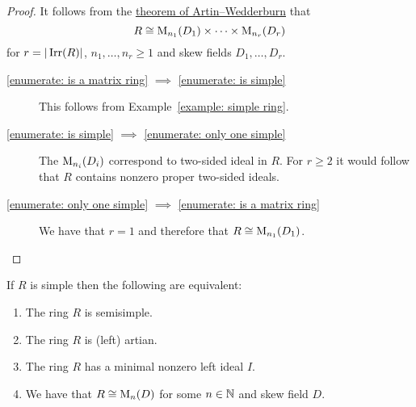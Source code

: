 \begin{proof}
  It follows from the \hyperref[theorem: artin wedderburn theorem]{theorem of Artin--Wedderburn} that
  \[
    R \cong \operatorname{M}_{n_1}(D_1) \times \dotsb \times \operatorname{M}_{n_r}(D_r)
  \]
  for $r = |\operatorname{Irr}(R)|$, $n_1, \dotsc, n_r \geq 1$ and skew fields $D_1, \dotsc, D_r$.
  
  \begin{description}
    \item[\ref*{enumerate: is a matrix ring} $\implies$ \ref*{enumerate: is simple}]
      This follows from Example~\ref{example: simple ring}.
    \item[\ref*{enumerate: is simple} $\implies$ \ref*{enumerate: only one simple}]
      The $\operatorname{M}_{n_i}(D_i)$ correspond to two-sided ideal in $R$.
      For $r \geq 2$ it would follow that $R$ contains nonzero proper two-sided ideals.
    \item[\ref*{enumerate: only one simple} $\implies$ \ref*{enumerate: is a matrix ring}]
      We have that $r = 1$ and therefore that $R \cong \operatorname{M}_{n_1}(D_1)$.
    \qedhere
  \end{description}
\end{proof}


\begin{theorem}[Wedderburn]
  \label{theorem: wedderburns theorem}
  If $R$ is simple then the following are equivalent:
  \begin{enumerate}
    \item
      \label{enumerate: is semisimple}
      The ring $R$ is semisimple.
    \item 
      \label{enumerate: is left artian}
      The ring $R$ is (left) artian.
    \item
      \label{enumerate: has minimal left ideal}
      The ring $R$ has a minimal nonzero left ideal $I$.
    \item
      \label{enumerate: is matrix ring over skew field}
      We have that $R \cong \operatorname{M}_n(D)$ for some $n \in \mathbb{N}$ and skew field $D$.
  \end{enumerate}
\end{theorem}


